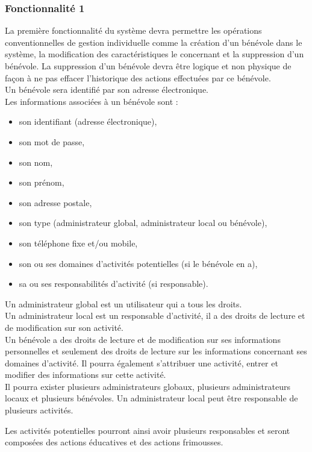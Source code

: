 \subsubsection{Fonctionnalité 1}
La première fonctionnalité du système devra permettre les opérations conventionnelles de gestion individuelle comme la création d'un bénévole dans le système, la modification des caractéristiques le concernant et la suppression d'un bénévole. La suppression d'un bénévole devra être logique et non physique de façon à ne pas effacer l'historique des actions effectuées par ce bénévole. \\
Un bénévole sera identifié par son adresse électronique.\\ 
Les informations associées à un bénévole sont :
\begin{itemize}
\item son identifiant (adresse électronique),
\item son mot de passe,
\item son nom,
\item son prénom,
\item son adresse postale,
\item son type (administrateur global, administrateur local ou bénévole),
\item son téléphone fixe et/ou mobile,
\item son ou ses domaines d'activités potentielles (si le bénévole en a),
\item sa ou ses responsabilités d'activité (si responsable).
\\
\end{itemize}

Un administrateur global est un utilisateur qui a tous les droits. \\ Un administrateur local est un responsable d'activité, il a des droits de lecture et de modification sur son activité. \\ Un bénévole a des droits de lecture et de modification sur ses informations personnelles et seulement des droits de lecture sur les informations concernant ses domaines d'activité. Il pourra également s'attribuer une activité, entrer et modifier des informations sur cette activité.\\
Il pourra exister plusieurs administrateurs globaux, plusieurs administrateurs locaux et plusieurs bénévoles. Un administrateur local peut être responsable de plusieurs activités.

Les activités potentielles pourront ainsi avoir plusieurs responsables et seront composées  des actions éducatives et des actions frimousses. \\

